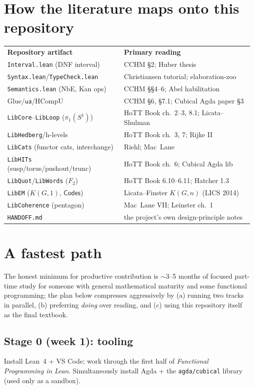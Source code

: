 \documentclass[11pt]{article}
\newcommand{\op}[1]{\ensuremath{\mathsf{#1}}}
\begin{document}
\section{How the literature maps onto this repository}

\begin{center}
\begin{tabular}{ll}
\textbf{Repository artifact} & \textbf{Primary reading}\\[2pt]
\texttt{Interval.lean} (DNF interval) & CCHM \S2; Huber thesis\\
\texttt{Syntax.lean}/\texttt{TypeCheck.lean} & Christiansen tutorial; elaboration-zoo\\
\texttt{Semantics.lean} (NbE, Kan ops) & CCHM \S\S4--6; Abel habilitation\\
Glue/\op{ua}/HCompU & CCHM \S6, \S7.1; Cubical Agda paper \S3\\
\texttt{LibCore}--\texttt{LibLoop} ($\pi_1(S^1)$) & HoTT Book ch.\ 2--3, 8.1; Licata--Shulman\\
\texttt{LibHedberg}/h-levels & HoTT Book ch.\ 3, 7; Rijke II\\
\texttt{LibCats} (functor cats, interchange) & Riehl; Mac~Lane\\
\texttt{LibHITs} (susp/torus/pushout/trunc) & HoTT Book ch.\ 6; Cubical Agda lib\\
\texttt{LibQuot}/\texttt{LibWords} ($F_2$) & HoTT Book 6.10--6.11; Hatcher 1.3\\
\texttt{LibEM} ($K(G,1)$, \op{Codes}) & Licata--Finster $K(G,n)$ (LICS 2014)\\
\texttt{LibCoherence} (pentagon) & Mac~Lane VII; Leinster ch.\ 1\\
\texttt{HANDOFF.md} & the project's own design-principle notes
\end{tabular}
\end{center}

\section{A fastest path}

The honest minimum for productive contribution is $\sim$3--5 months of
focused part-time study for someone with general mathematical maturity
and some functional programming; the plan below compresses aggressively
by (a) running two tracks in parallel, (b) preferring \emph{doing} over
reading, and (c) using this repository itself as the final textbook.

\subsection*{Stage 0 (week 1): tooling}
Install Lean~4 + VS Code; work through the first half of
\emph{Functional Programming in Lean}.  Simultaneously install Agda +
the \texttt{agda/cubical} library (used only as a sandbox).
\end{document}
